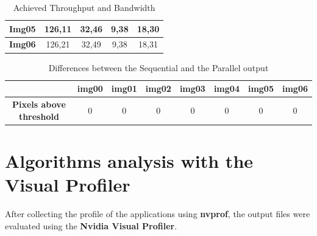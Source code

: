 \documentclass[a4paper]{article}
\begin{document}
\begin{table}[!ht]
\begin{tabular}{|c|c|c|c|c|}
\textbf{Img05}  & 126,11                                                                        & 32,46                                                                    & 9,38                                                                        & 18,30                                                                         \\ \hline
\textbf{Img06}  & 126,21                                                                        & 32,49                                                                    & 9,38                                                                        & 18,31                                                                         \\ \hline
\end{tabular}
\caption{Achieved Throughput and Bandwidth}
\label{tab:smooth-abt}
\end{table}
\FloatBarrier

\begin{table}[!ht]
\centering
\begin{tabular}{|c|l|c|c|l|l|l|l|}
\hline
\textbf{}                        & \textbf{img00}         & \textbf{img01} & \textbf{img02} & \textbf{img03}         & \textbf{img04}         & \textbf{img05}         & \textbf{img06}         \\ \hline
\textbf{Pixels above  threshold} & \multicolumn{1}{c|}{0} & 0              & 0              & \multicolumn{1}{c|}{0} & \multicolumn{1}{c|}{0} & \multicolumn{1}{c|}{0} & \multicolumn{1}{c|}{0} \\ \hline
\end{tabular}
\caption{Differences between the Sequential and the Parallel output}
\label{tab:pxabs}
\end{table}
\FloatBarrier

\newpage

\section{Algorithms analysis with the Visual Profiler}
\label{sec:vp}
After collecting the profile of the applications using \textbf{nvprof}, the output files were evaluated using the \textbf{Nvidia Visual Profiler}.
\end{document}
